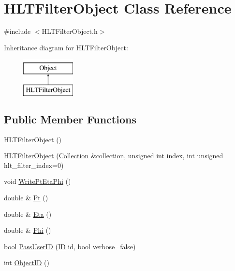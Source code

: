 \hypertarget{class_h_l_t_filter_object}{}\section{H\+L\+T\+Filter\+Object Class Reference}
\label{class_h_l_t_filter_object}


{\ttfamily \#include $<$H\+L\+T\+Filter\+Object.\+h$>$}

Inheritance diagram for H\+L\+T\+Filter\+Object\+:\begin{figure}[H]
\begin{center}
\leavevmode
\includegraphics[height=2.000000cm]{class_h_l_t_filter_object}
\end{center}
\end{figure}
\subsection*{Public Member Functions}
\begin{DoxyCompactItemize}
\item 
\hyperlink{class_h_l_t_filter_object_a2546f99bd521875c44688d2ba97430ce}{H\+L\+T\+Filter\+Object} ()
\item 
\hyperlink{class_h_l_t_filter_object_a808d2e40a6e569a823bd7b9045ab80b1}{H\+L\+T\+Filter\+Object} (\hyperlink{class_collection}{Collection} \&collection, unsigned int index, int unsigned hlt\+\_\+filter\+\_\+index=0)
\item 
void \hyperlink{class_h_l_t_filter_object_a9d7acc3a76a2ce737dea1621027ff12c}{Write\+Pt\+Eta\+Phi} ()
\item 
double \& \hyperlink{class_h_l_t_filter_object_a29c406ea1c2dba2eca9faf17d0bb5f4e}{Pt} ()
\item 
double \& \hyperlink{class_h_l_t_filter_object_ade8858903109a380c3283b6e4203630b}{Eta} ()
\item 
double \& \hyperlink{class_h_l_t_filter_object_ae0928b247a39fa2b238312696704e370}{Phi} ()
\item 
bool \hyperlink{class_h_l_t_filter_object_a19346504ef5d039ff4032581ccccf604}{Pass\+User\+I\+D} (\hyperlink{_i_d_types_8h_a094c367727273b4da2b960ca3b3edc06}{I\+D} id, bool verbose=false)
\item 
int \hyperlink{class_h_l_t_filter_object_ac50d370e4de054e32ef3bd82f0be8e74}{Object\+I\+D} ()
\end{DoxyCompactItemize}

